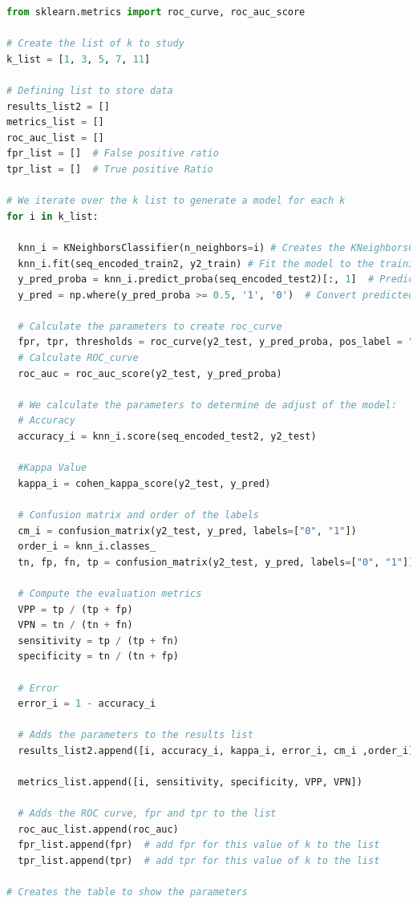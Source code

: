 \documentclass[
]{article}
\begin{document}
\begin{lstlisting}[language=Python]
from sklearn.metrics import roc_curve, roc_auc_score

# Create the list of k to study
k_list = [1, 3, 5, 7, 11]

# Defining list to store data
results_list2 = []
metrics_list = []
roc_auc_list = []
fpr_list = []  # False positive ratio
tpr_list = []  # True positive Ratio

# We iterate over the k list to generate a model for each k
for i in k_list:
  
  knn_i = KNeighborsClassifier(n_neighbors=i) # Creates the KNeighborsClassifier object with k=i
  knn_i.fit(seq_encoded_train2, y2_train) # Fit the model to the training set
  y_pred_proba = knn_i.predict_proba(seq_encoded_test2)[:, 1]  # Predicted probabilities of class 1
  y_pred = np.where(y_pred_proba >= 0.5, '1', '0')  # Convert predicted probabilities to binary class labels
  
  # Calculate the parameters to create roc_curve
  fpr, tpr, thresholds = roc_curve(y2_test, y_pred_proba, pos_label = "1")
  # Calculate ROC_curve
  roc_auc = roc_auc_score(y2_test, y_pred_proba)
  
  # We calculate the parameters to determine de adjust of the model:
  # Accuracy
  accuracy_i = knn_i.score(seq_encoded_test2, y2_test)
  
  #Kappa Value
  kappa_i = cohen_kappa_score(y2_test, y_pred)
  
  # Confusion matrix and order of the labels
  cm_i = confusion_matrix(y2_test, y_pred, labels=["0", "1"])
  order_i = knn_i.classes_
  tn, fp, fn, tp = confusion_matrix(y2_test, y_pred, labels=["0", "1"]).ravel()
  
  # Compute the evaluation metrics
  VPP = tp / (tp + fp)
  VPN = tn / (tn + fn)
  sensitivity = tp / (tp + fn)
  specificity = tn / (tn + fp)
  
  # Error
  error_i = 1 - accuracy_i
  
  # Adds the parameters to the results list
  results_list2.append([i, accuracy_i, kappa_i, error_i, cm_i ,order_i])
  
  metrics_list.append([i, sensitivity, specificity, VPP, VPN])
  
  # Adds the ROC curve, fpr and tpr to the list
  roc_auc_list.append(roc_auc)
  fpr_list.append(fpr)  # add fpr for this value of k to the list
  tpr_list.append(tpr)  # add tpr for this value of k to the list

# Creates the table to show the parameters
\end{lstlisting}
\end{document}
